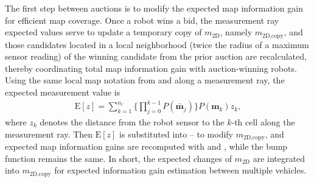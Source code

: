 The first step between auctions is to modify the expected map information gain for efficient map coverage.  Once a robot wins a bid, the measurement ray expected values serve to update a temporary copy of $m_\text{2D}$, namely $m_\text{2D,copy}$, and those candidates located in a local neighborhood (twice the radius of a maximum sensor reading) of the winning candidate from the prior auction are recalculated, thereby coordinating total map information gain with auction-winning robots. Using the same local map notation from  and  along a measurement ray, the expected measurement value is
\begin{align}
\label{eqn:ExpectedMeasRay}
\text{E}[z]=\sum_{k=1}^{n_{r}}\bigg\{\prod_{j=0}^{k-1}P(\bar{\mathbf{m}}_j)\bigg\}P(\mathbf{m}_k)z_k,
\end{align}
where $z_k$ denotes the distance from the robot sensor to the $k$-th cell along the measurement ray. Then $\text{E}[z]$ is substituted into -- to modify $m_\text{2D,copy}$, and expected map information gains are recomputed with  and , while the bump function  remains the same. In short, the expected changes of $m_\text{2D}$ are integrated into $m_\text{2D,copy}$ for expected information gain estimation between multiple vehicles.


